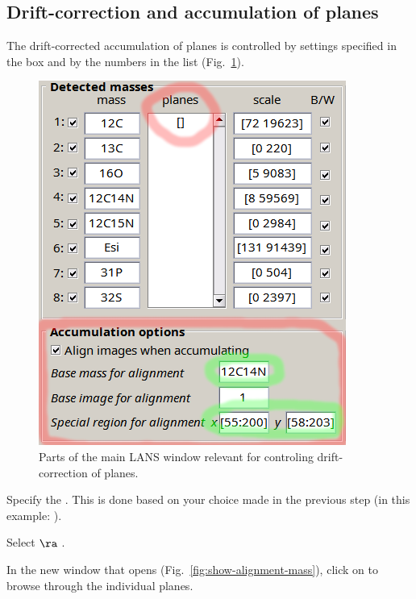 
\subsection{Drift-correction and accumulation of planes}
\setcounter{step}{0}
\label{sec:drift-correction-accumulation}

The drift-corrected accumulation of planes is controlled by settings specified in the  box and by the numbers in the  list (Fig.~\ref{fig:alignoptions}). 

\begin{figure}[!ht]
\centering
\includegraphics[scale=0.4]{figs3/LANS-main-alignment}
\caption{\label{fig:alignoptions}%
Parts of the main LANS window relevant for controling drift-correction of planes.}
\end{figure}

\s Specify the . This is done based on your choice made in the previous step (in this example: ). 

\s Select  $\ra$ . 

\nb
\bul In the new window that opens (Fig.~\ref{fig:show-alignment-mass}), click on  to browse through the individual planes. 

